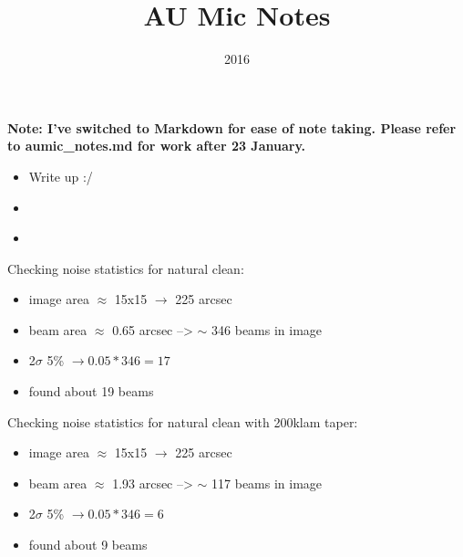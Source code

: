 \documentclass[a4paper]{tufte-handout}
\title{AU Mic Notes}
\date{2016}
\begin{document}
\maketitle

\textbf{Note: I've switched to Markdown for ease of note taking. Please refer to aumic\_notes.md for work after 23 January.}

\begin{tasks}
	\begin{itemize}
		\item Write up :/
	\end{itemize}
\end{tasks}


\begin{maybe}
	\begin{itemize}
		\item
	\end{itemize}
\end{maybe}


\begin{mer}
	\begin{itemize}
		\item
	\end{itemize}

\end{mer}

Checking noise statistics for natural clean:\\
\begin{itemize}
  \item image area $\approx$ 15x15 $\to$ 225 arcsec
  \item beam area $\approx$ 0.65 arcsec --> $\sim$ 346 beams in image
  \item 2$\sigma$ 5\% $\to 0.05 * 346 = 17$
  \item found about 19 beams
\end{itemize}

\noindent Checking noise statistics for natural clean with 200klam taper:\\
\begin{itemize}
  \item image area $\approx$ 15x15 $\to$ 225 arcsec
  \item beam area $\approx$ 1.93 arcsec --> $\sim$ 117 beams in image
  \item 2$\sigma$ 5\% $\to 0.05 * 346 = 6$
  \item found about 9 beams
\end{itemize}
\end{document}
